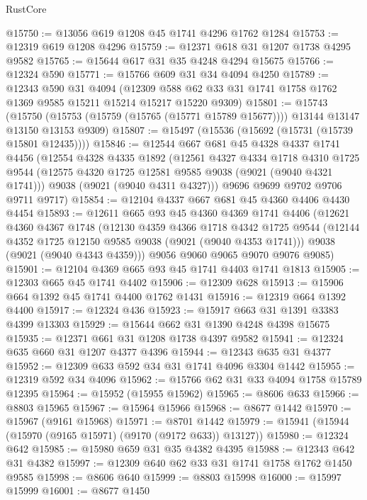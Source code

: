 \begin{lexlean}{RustCore}
\begin{coremodule}
@15750 := @13056 @619 @1208 @45 @1741 @4296 @1762 @1284
@15753 := @12319 @619 @1208 @4296
@15759 := @12371 @618 @31 @1207 @1738 @4295 @9582
@15765 := @15644 @617 @31 @35 @4248 @4294 @15675
@15766 := @12324 @590
@15771 := @15766 @609 @31 @34 @4094 @4250
@15789 := @12343
    @590
    @31
    @4094
    (@12309 @588 @62 @33 @31 @1741 @1758 @1762 @1369 @9585 @15211 @15214 @15217 @15220 @9309)
@15801 := @15743
    (@15750 (@15753 (@15759 (@15765 (@15771 @15789 @15677)))) @13144 @13147 @13150 @13153 @9309)
@15807 := @15497 (@15536 (@15692 (@15731 (@15739 @15801 @12435))))
@15846 := @12544
    @667
    @681
    @45
    @4328
    @4337
    @1741
    @4456
    (@12554
      @4328
      @4335
      @1892
      (@12561
        @4327
        @4334
        @1718
        @4310
        @1725
        @9544
        (@12575 @4320 @1725 @12581 @9585 @9038 (@9021 (@9040 @4321 @1741)))
        @9038
        (@9021 (@9040 @4311 @4327)))
      @9696
      @9699
      @9702
      @9706
      @9711
      @9717)
@15854 := @12104 @4337 @667 @681 @45 @4360 @4406 @4430 @4454
@15893 := @12611
    @665
    @93
    @45
    @4360
    @4369
    @1741
    @4406
    (@12621
      @4360
      @4367
      @1748
      (@12130
        @4359
        @4366
        @1718
        @4342
        @1725
        @9544
        (@12144 @4352 @1725 @12150 @9585 @9038 (@9021 (@9040 @4353 @1741)))
        @9038
        (@9021 (@9040 @4343 @4359)))
      @9056
      @9060
      @9065
      @9070
      @9076
      @9085)
@15901 := @12104 @4369 @665 @93 @45 @1741 @4403 @1741 @1813
@15905 := @12303 @665 @45 @1741 @4402
@15906 := @12309 @628
@15913 := @15906 @664 @1392 @45 @1741 @4400 @1762 @1431
@15916 := @12319 @664 @1392 @4400
@15917 := @12324 @436
@15923 := @15917 @663 @31 @1391 @3383 @4399 @13303
@15929 := @15644 @662 @31 @1390 @4248 @4398 @15675
@15935 := @12371 @661 @31 @1208 @1738 @4397 @9582
@15941 := @12324 @635 @660 @31 @1207 @4377 @4396
@15944 := @12343 @635 @31 @4377
@15952 := @12309 @633 @592 @34 @31 @1741 @4096 @3304 @1442
@15955 := @12319 @592 @34 @4096
@15962 := @15766 @62 @31 @33 @4094 @1758 @15789 @12395
@15964 := @15952 (@15955 @15962)
@15965 := @8606 @633
@15966 := @8803 @15965
@15967 := @15964 @15966
@15968 := @8677 @1442
@15970 := @15967 (@9161 @15968)
@15971 := @8701 @1442
@15979 := @15941 (@15944 (@15970 (@9165 @15971) (@9170 (@9172 @633)) @13127))
@15980 := @12324 @642
@15985 := @15980 @659 @31 @35 @4382 @4395
@15988 := @12343 @642 @31 @4382
@15997 := @12309 @640 @62 @33 @31 @1741 @1758 @1762 @1450 @9585
@15998 := @8606 @640
@15999 := @8803 @15998
@16000 := @15997 @15999
@16001 := @8677 @1450

\end{coremodule}
\end{lexlean}
